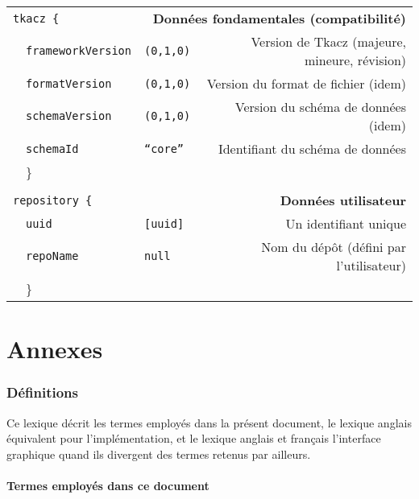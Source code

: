\documentclass[11pt,french]{article}
\begin{document}
\begin{table}[H]
\begin{tabular*}{1\columnwidth}{@{\extracolsep{\fill}}l|llr}
\multicolumn{2}{|l}{\texttt{tkacz \{}} & \multicolumn{2}{r}{\textbf{Données fondamentales (compatibilité)}}\tabularnewline
\cline{1-1} 
 & \texttt{frameworkVersion} & \texttt{(0,1,0)} & Version de Tkacz (majeure, mineure, révision)\tabularnewline
 & \texttt{formatVersion} & \texttt{(0,1,0)} & Version du format de fichier (idem)\tabularnewline
 & \texttt{schemaVersion} & \texttt{(0,1,0)} & Version du schéma de données (idem)\tabularnewline
 & \texttt{schemaId} & \texttt{“core”} & Identifiant du schéma de données\tabularnewline
\multicolumn{1}{l}{} & \} &  & \tabularnewline
\multicolumn{1}{l}{} &  &  & \tabularnewline
\multicolumn{2}{|l}{\texttt{repository \{}} & \multicolumn{2}{r}{\textbf{Données utilisateur}}\tabularnewline
\cline{1-1} 
 & \texttt{uuid} & \texttt{{[}uuid{]}} & Un identifiant unique\tabularnewline
 & \texttt{repoName} & \texttt{null} & Nom du dépôt (défini par l'utilisateur)\tabularnewline
\multicolumn{1}{l}{} & \} &  & \tabularnewline
\end{tabular*}
\end{table}


\appendix
\clearpage


\part{Annexes}


\section{Définitions}

Ce lexique décrit les termes employés dans la présent document, le
lexique anglais équivalent pour l'implémentation, et le lexique anglais
et français l'interface graphique quand ils divergent des termes retenus
par ailleurs.

\newcommand*\cf[1]{$\to$ \textit{#1}.}


\subsection{Termes employés dans ce document}
\end{document}
